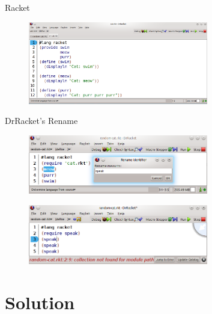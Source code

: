 \documentclass[xcolor=dvipsnames, 14pt]{beamer}
\begin{document}
\begin{frame}{Racket}
\begin{figure}[htbp]
  \centering
  \includegraphics[width=0.7\textwidth]{img/cat-definition.png}
  \label{fig:renameBefore}
\end{figure}
\end{frame}
\begin{frame}{DrRacket's Rename}
\begin{figure}[htbp]
  \centering
  \includegraphics[width=0.7\textwidth]{img/renameV3-2.png}
  \label{fig:renameBefore}
\end{figure}

\begin{figure}[htbp]
  \centering
  \includegraphics[width=0.7\textwidth]{img/rename-error.png}
  \label{fig:RacketBug}
\end{figure}
\end{frame}

\section{Solution}
\end{document}
